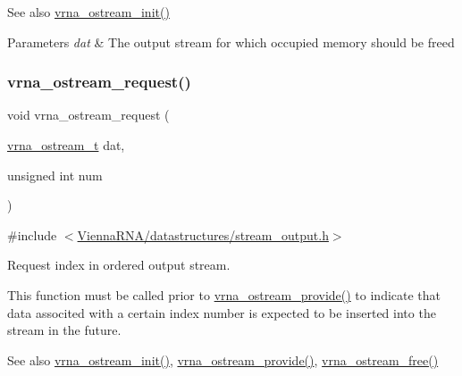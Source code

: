 \begin{DoxySeeAlso}{See also}
\mbox{\hyperlink{group__buffer__utils_gad23113e66a0910ec2341856e2da56bf6}{vrna\+\_\+ostream\+\_\+init()}}
\end{DoxySeeAlso}

\begin{DoxyParams}{Parameters}
{\em dat} & The output stream for which occupied memory should be free\textquotesingle{}d \\
\hline
\end{DoxyParams}
\mbox{\label{group__buffer__utils_gaebca91932705d71bcbf00bd8d82bd7c8}} 
\subsubsection{\texorpdfstring{vrna\_ostream\_request()}{vrna\_ostream\_request()}}
{\footnotesize\ttfamily void vrna\+\_\+ostream\+\_\+request (\begin{DoxyParamCaption}\item[{\mbox{\hyperlink{group__buffer__utils_ga8da189552af21ab6e4e88bdcc240870c}{vrna\+\_\+ostream\+\_\+t}}}]{dat,  }\item[{unsigned int}]{num }\end{DoxyParamCaption})}



{\ttfamily \#include $<$\mbox{\hyperlink{datastructures_2stream__output_8h}{Vienna\+R\+N\+A/datastructures/stream\+\_\+output.\+h}}$>$}



Request index in ordered output stream. 

This function must be called prior to \mbox{\hyperlink{group__buffer__utils_ga6253c42abdeaf3b41a38204865e1f0f7}{vrna\+\_\+ostream\+\_\+provide()}} to indicate that data associted with a certain index number is expected to be inserted into the stream in the future.

\begin{DoxySeeAlso}{See also}
\mbox{\hyperlink{group__buffer__utils_gad23113e66a0910ec2341856e2da56bf6}{vrna\+\_\+ostream\+\_\+init()}}, \mbox{\hyperlink{group__buffer__utils_ga6253c42abdeaf3b41a38204865e1f0f7}{vrna\+\_\+ostream\+\_\+provide()}}, \mbox{\hyperlink{group__buffer__utils_gaf813ec90e1446ba82c89f9a39688a3b3}{vrna\+\_\+ostream\+\_\+free()}}
\end{DoxySeeAlso}

